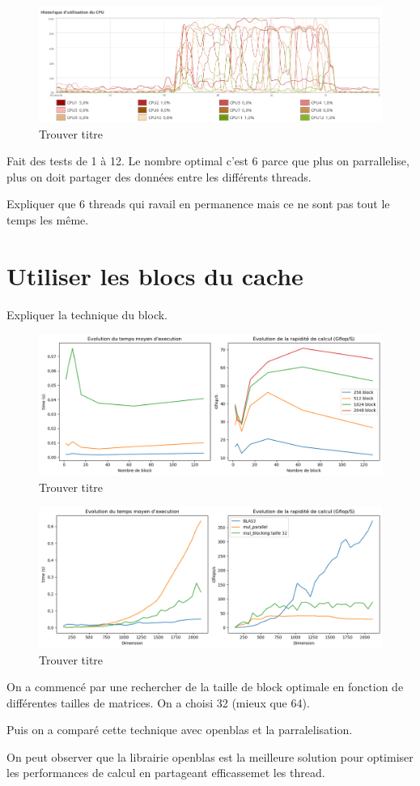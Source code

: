 \documentclass{report}
\begin{document}
\begin{figure}[H]
    \centering
    \includegraphics[width=0.7\linewidth]{images/useCPU.png}
    \caption{Trouver titre}
    \label{fig:7}
\end{figure}

Fait des tests de 1 à 12. Le nombre optimal c'est 6 parce que plus on parrallelise, plus on doit partager des données entre les différents threads. 

Expliquer que 6 threads qui ravail en permanence mais ce ne sont pas tout le temps les même.

\chapter{Utiliser les blocs du cache}

Expliquer la technique du block.

\begin{figure}[H]
    \centering
    \includegraphics[width=0.7\linewidth]{images/fig7.png}
    \caption{Trouver titre}
    \label{fig:8}
\end{figure}

\begin{figure}[H]
    \centering
    \includegraphics[width=0.7\linewidth]{images/fig9.png}
    \caption{Trouver titre}
    \label{fig:9}
\end{figure}

On a commencé par une rechercher de la taille de block optimale en fonction de différentes tailles de matrices. On a choisi 32 (mieux que 64).

Puis on a comparé cette technique avec openblas et la parralelisation.

On peut observer que la librairie openblas est la meilleure solution pour optimiser les performances de calcul en partageant efficassemet les thread.



\end{document}
